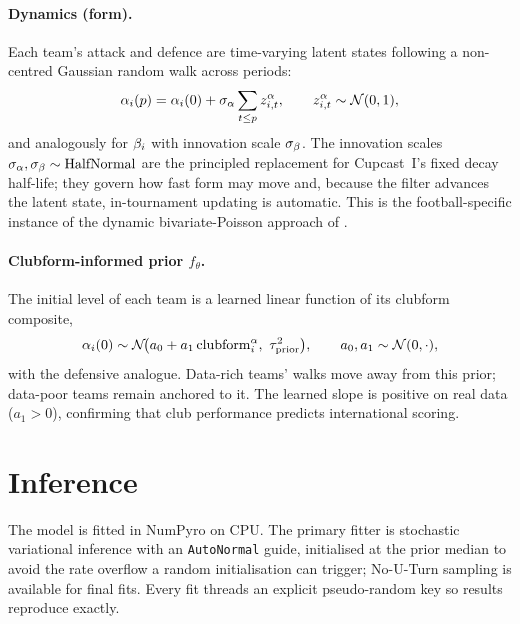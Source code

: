 \documentclass[11pt]{article}
\begin{document}
\paragraph{Dynamics (form).} Each team's attack and defence are time-varying
latent states following a non-centred Gaussian random walk across periods:
\begin{equation}
\alpha_i(p) = \alpha_i(0) + \sigma_\alpha \sum_{t\le p} z^{\alpha}_{i,t},
\qquad z^{\alpha}_{i,t}\sim\mathcal N(0,1),
\end{equation}
and analogously for $\beta_i$ with innovation scale $\sigma_\beta$. The innovation
scales $\sigma_\alpha,\sigma_\beta\sim\mathrm{HalfNormal}$ are the principled
replacement for Cupcast~I's fixed decay half-life; they govern how fast form may
move and, because the filter advances the latent state, in-tournament updating
is automatic. This is the football-specific instance of the dynamic
bivariate-Poisson approach of \cite{koopmanlit2015,baioblangiardo2010}.

\paragraph{Clubform-informed prior $f_\theta$.} The initial level of each team
is a learned linear function of its clubform composite,
\begin{equation}
\att_i(0) \sim \mathcal N\!\big(a_0 + a_1\,\mathrm{clubform}^{\att}_i,\ \tau_{\text{prior}}^2\big),
\qquad a_0,a_1 \sim \mathcal N(0,\cdot),
\end{equation}
with the defensive analogue. Data-rich teams' walks move away from this prior;
data-poor teams remain anchored to it. The learned slope is positive on real
data ($a_1>0$), confirming that club performance predicts international scoring.

\section{Inference}\label{sec:inf}
The model is fitted in NumPyro \cite{phan2019numpyro} on CPU. The primary fitter
is stochastic variational inference with an \texttt{AutoNormal} guide,
initialised at the prior median to avoid the rate overflow a random
initialisation can trigger; No-U-Turn sampling is available for final fits.
Every fit threads an explicit pseudo-random key so results reproduce exactly.
\end{document}
